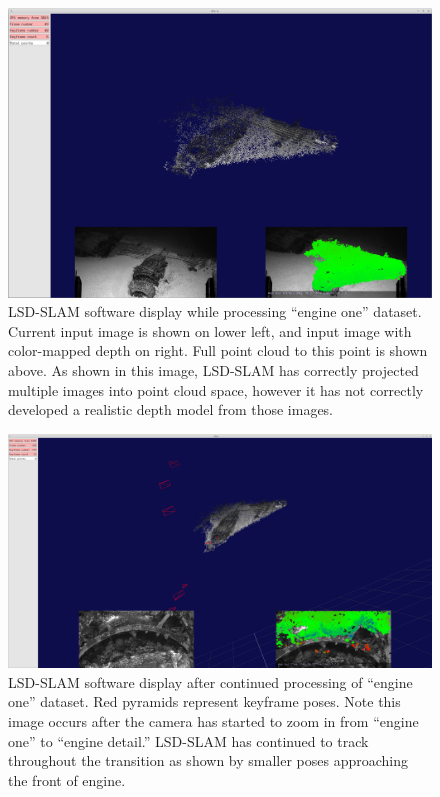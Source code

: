\documentclass[letterpaper,12pt]{article}
\begin{document}
\begin{figure}
    \centering
    \includegraphics[width=\textwidth]{images/lsd_slam_engine_two.png}
    \caption{LSD-SLAM software display while processing ``engine one'' dataset.    Current input image is shown on lower left, and input image with color-mapped depth on right.   Full point cloud to this point is shown above.  As shown in this image, LSD-SLAM has correctly projected multiple images into point cloud space, however it has not correctly developed a realistic depth model from those images.} 
    \label{fig:lsd_slam_engine}
\end{figure}

\begin{figure}
    \centering
    \includegraphics[width=\textwidth]{images/lsd_slam_engine.png}
    \caption{LSD-SLAM software display after continued processing of ``engine one'' dataset.  Red pyramids represent keyframe poses.   Note this image occurs after the camera has started to zoom in from ``engine one'' to ``engine detail.''  LSD-SLAM has continued to track throughout the transition as shown by smaller poses approaching the front of engine.}
    \label{fig:lsd_slam_engine_detail}
\end{figure}
\end{document}
